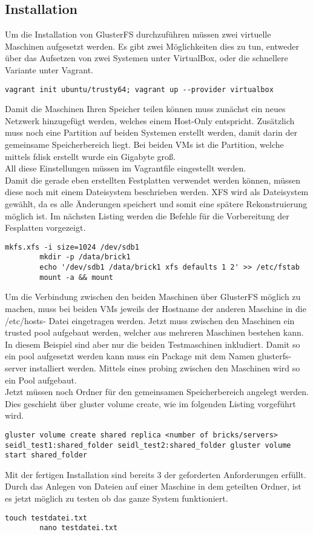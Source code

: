 \subsection{Installation}
	Um die Installation von GlusterFS durchzuführen müssen zwei virtuelle Maschinen aufgesetzt werden. Es gibt zwei Möglichkeiten dies zu tun, entweder über das Aufsetzen von zwei Systemen unter VirtualBox, oder die schnellere Variante unter Vagrant.
	\begin{lstlisting}[style=Java, caption=Vagrant Setup]
		vagrant init ubuntu/trusty64; vagrant up --provider virtualbox
	\end{lstlisting}
	Damit die Maschinen Ihren Speicher teilen können muss zunächst ein neues Netzwerk hinzugefügt werden, welches einem Host-Only entspricht. Zusätzlich muss noch eine Partition auf beiden Systemen erstellt werden, damit darin der gemeinsame Speicherbereich liegt. Bei beiden VMs ist die Partition, welche mittels fdisk erstellt wurde ein Gigabyte groß.\\
	All diese Einstellungen müssen im Vagrantfile eingestellt werden. \\
	Damit die gerade eben erstellten Festplatten verwendet werden können, müssen diese noch mit einem Dateisystem beschrieben werden. XFS wird als Dateisystem gewählt, da es alle Änderungen speichert und somit eine spätere Rekonstruierung möglich ist. Im nächsten Listing werden die Befehle für die Vorbereitung der Fesplatten vorgezeigt.
	\begin{lstlisting}[style=Java, caption=Vorbereitung der Festplatten]
		mkfs.xfs -i size=1024 /dev/sdb1
		mkdir -p /data/brick1
		echo '/dev/sdb1 /data/brick1 xfs defaults 1 2' >> /etc/fstab
		mount -a && mount
	\end{lstlisting}
	Um die Verbindung zwischen den beiden Maschinen über GlusterFS möglich zu machen, muss bei beiden VMs jeweils der Hostname der anderen Maschine in die /etc/hosts- Datei eingetragen werden. Jetzt muss zwischen den Maschinen ein trusted pool aufgebaut werden, welcher aus mehreren Maschinen bestehen kann. In diesem Beispiel sind aber nur die beiden Testmaschinen inkludiert. Damit so ein pool aufgesetzt werden kann muss ein Package mit dem Namen glusterfs-server installiert werden. Mittels eines probing zwischen den Maschinen wird so ein Pool aufgebaut.\\
	Jetzt müssen noch Ordner für den gemeinsamen Speicherbereich angelegt werden. Dies geschieht über gluster volume create, wie im folgenden Listing vorgeführt wird.
	\begin{lstlisting}[style=Java, caption=Gluster Volume]
		gluster volume create shared replica <number of bricks/servers> seidl_test1:shared_folder seidl_test2:shared_folder gluster volume start shared_folder
	\end{lstlisting}
	Mit der fertigen Installation sind bereits 3 der geforderten Anforderungen erfüllt. Durch das Anlegen von Dateien auf einer Maschine in dem geteilten Ordner, ist es jetzt möglich zu testen ob das ganze System funktioniert.
	\begin{lstlisting}[style=Java, caption=Erstellen einer Datei im Shared folder]
		touch testdatei.txt
		nano testdatei.txt
	\end{lstlisting}	
	
